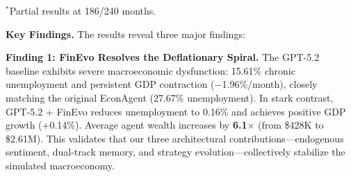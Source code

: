 \begin{table}[h]
\centering
\caption{Large-Scale Evaluation: 100 Agents / 240 Months. \dag~denotes high API error rate ($>$30\%), results reported for reference. $\dagger\dagger$~Gemini-3-Pro is partial (186/240 months, daily quota exhausted).}
\label{tab:large_scale}
\footnotesize{$^*$Partial results at 186/240 months.}
\end{table}

\noindent\textbf{Key Findings.}
The results reveal three major findings:

\noindent\textbf{Finding 1: FinEvo Resolves the Deflationary Spiral.}
The GPT-5.2 baseline exhibits severe macroeconomic dysfunction: 15.61\% chronic unemployment and persistent GDP contraction ($-$1.96\%/month), closely matching the original EconAgent (27.67\% unemployment). In stark contrast, GPT-5.2 + FinEvo reduces unemployment to 0.16\% and achieves positive GDP growth (+0.14\%). Average agent wealth increases by \textbf{6.1$\times$} (from \$428K to \$2.61M). This validates that our three architectural contributions---endogenous sentiment, dual-track memory, and strategy evolution---collectively stabilize the simulated macroeconomy.

